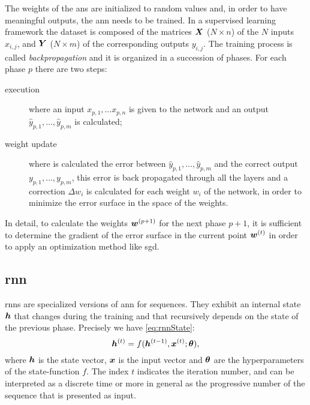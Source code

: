 The weights of the \acp{an} are initialized to random values and, in order
to have meaningful outputs, the \ac{ann} needs to be trained. In a
supervised learning framework the dataset is composed of the matrices
$\bm{X}$ ($N\times n$) of the $N$ inputs $x_{i,j}$, and $\bm{Y}$
($N\times m$) of 
the corresponding outputs $y_{i,j}$. The
training process is called \emph{backpropagation} and it is organized in a
succession of phases. For each phase $p$ there are two steps:
\begin{description}
\item[execution] where an input $x_{p,1},\dots x_{p,n}$ is given to
  the network and an output $\hat{y}_{p,1},\dots,\hat{y}_{p,m}$ is calculated;
\item[weight update] where is calculated the error between
  $\hat{y}_{p,1},\dots,\hat{y}_{p,m}$ and the correct output
  $y_{p,1},\dots,y_{p,m}$, this error is back propagated through all
  the layers and a correction $\Delta w_i$ is calculated for each weight $w_i$ of
  the network, in
  order to minimize the error surface in the space of the weights.
\end{description}
In detail, to calculate the weights $\bm{w}^{(p+1)}$ for the next
phase $p+1$, it is 
sufficient to determine the gradient of 
the error surface in the current point $\bm{w}^{(t)}$ in order to
apply an optimization method like \ac{sgd}.

\subsection{\acf{rnn}}
\acp{rnn} are specialized versions of \ac{ann} for sequences. They
exhibit an
internal state $\bm{h}$ that changes during the training and that
recursively depends on the state of the previous phase. Precisely we
have \cref{eq:rnnState}:
\begin{equation}\label{eq:rnnState}
  \bm{h}^{(t)} = f(\bm{h}^{(t-1)}, \bm{x}^{(t)}; \bm{\theta}),
\end{equation}
where $\bm{h}$ is the state vector, $\bm{x}$ is the input vector
and $\bm{\theta}$ are the hyperparameters of the state-function
$f$. The index $t$ indicates 
the iteration number, and can be interpreted as a discrete time or
more in general as the progressive number of the sequence that is
presented as
input.

